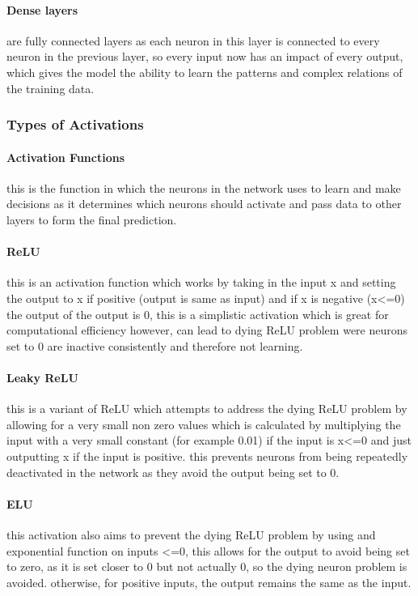 \documentclass[]{final_report}
\begin{document}
\paragraph{Dense layers}
are fully connected layers as each neuron in this layer is connected to every neuron in the previous layer, so every input now has an impact of every output, which gives the model the ability to learn the patterns and complex relations of the training data.

\subsubsection{Types of Activations}

\paragraph{Activation Functions}
this is the function in which the neurons in the network uses to learn and make decisions as it determines which neurons should activate and pass data to other layers to form the final prediction.

\paragraph{ReLU}
this is an activation function which works by taking in the input x and setting the output to x if positive (output is same as input) and if x is negative (x<=0) the output of the output is 0, this is a simplistic activation which is great for computational efficiency however, can lead to dying ReLU problem were neurons set to 0 are inactive consistently and therefore not learning.

\paragraph{Leaky ReLU}
this is a variant of ReLU which attempts to address the dying ReLU problem by allowing for a very small non zero values which is calculated by multiplying the input with a very small constant (for example 0.01) if the input is x<=0 and just outputting x if the input is positive. this prevents neurons from being repeatedly deactivated in the network as they avoid the output being set to 0.

\paragraph{ELU}
this activation also aims to prevent the dying ReLU problem by using and exponential function on inputs <=0, this allows for the output to avoid being set to zero, as it is set closer to 0 but not actually 0, so the dying neuron problem is avoided. otherwise, for positive inputs, the output remains the same as the input.
\end{document}
